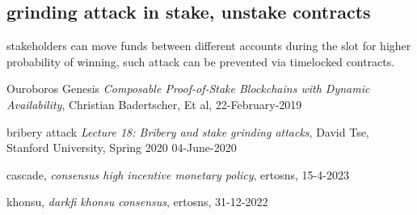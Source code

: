 \documentclass{article}
\begin{document}
\subsection {grinding attack in stake, unstake contracts}
stakeholders can move funds between different accounts during the slot for higher probability of winning, such attack can be prevented via timelocked contracts.



\begin{thebibliography}{999}

  Ouroboros Genesis
  \emph{Composable Proof-of-Stake Blockchains with Dynamic Availability},
  Christian Badertscher, Et al,
  22-February-2019

  bribery attack
  \emph{Lecture 18: Bribery and stake grinding attacks},
  David Tse,
  Stanford University, Spring 2020
  04-June-2020

  cascade,
  \emph{consensus high incentive monetary policy},
  ertosns,
  15-4-2023

  khonsu,
  \emph{darkfi khonsu consensus},
  ertosns,
  31-12-2022


\end{thebibliography}
\end{document}
